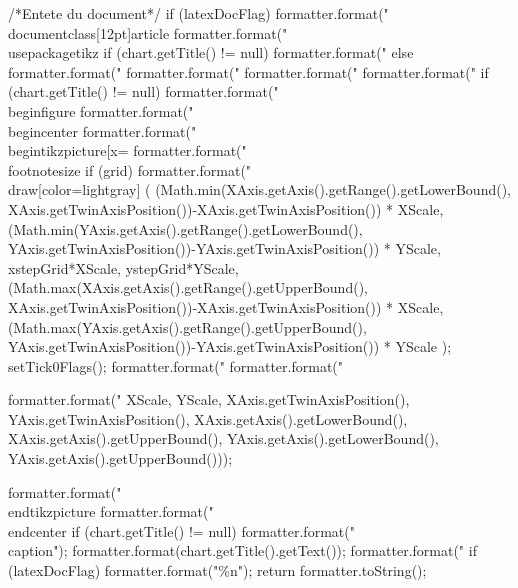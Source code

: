 \begin{code}
\begin{hide}
{      /*Entete du document*/
      if (latexDocFlag) {
         formatter.format("\\documentclass[12pt]{article}%
         formatter.format("\\usepackage{tikz}%
      }
      if (chart.getTitle() != null)
         formatter.format("%
      else
         formatter.format("%
      formatter.format("%
      formatter.format("%
      formatter.format("%
      if (chart.getTitle() != null)
         formatter.format("\\begin{figure}%
      formatter.format("\\begin{center}%
      formatter.format("\\begin{tikzpicture}[x=%
      formatter.format("\\footnotesize%
      if (grid)
         formatter.format("\\draw[color=lightgray] (%
            (Math.min(XAxis.getAxis().getRange().getLowerBound(), XAxis.getTwinAxisPosition())-XAxis.getTwinAxisPosition()) * XScale,
            (Math.min(YAxis.getAxis().getRange().getLowerBound(), YAxis.getTwinAxisPosition())-YAxis.getTwinAxisPosition()) * YScale,
            xstepGrid*XScale, ystepGrid*YScale,
            (Math.max(XAxis.getAxis().getRange().getUpperBound(), XAxis.getTwinAxisPosition())-XAxis.getTwinAxisPosition()) * XScale,
            (Math.max(YAxis.getAxis().getRange().getUpperBound(), YAxis.getTwinAxisPosition())-YAxis.getTwinAxisPosition()) * YScale );
      setTick0Flags();
      formatter.format("%
      formatter.format("%

      formatter.format("%
         XScale, YScale,
         XAxis.getTwinAxisPosition(), YAxis.getTwinAxisPosition(),
         XAxis.getAxis().getLowerBound(), XAxis.getAxis().getUpperBound(),
         YAxis.getAxis().getLowerBound(), YAxis.getAxis().getUpperBound()));

      formatter.format("\\end{tikzpicture}%
      formatter.format("\\end{center}%
      if (chart.getTitle() != null) {
         formatter.format("\\caption{");
         formatter.format(chart.getTitle().getText());
         formatter.format("}%
      }
      if (latexDocFlag)
         formatter.format("\%n");
      return formatter.toString();
   }\end{hide}
\end{code}

\begin{code}
\begin{hide}
}\end{hide}
\end{code}
